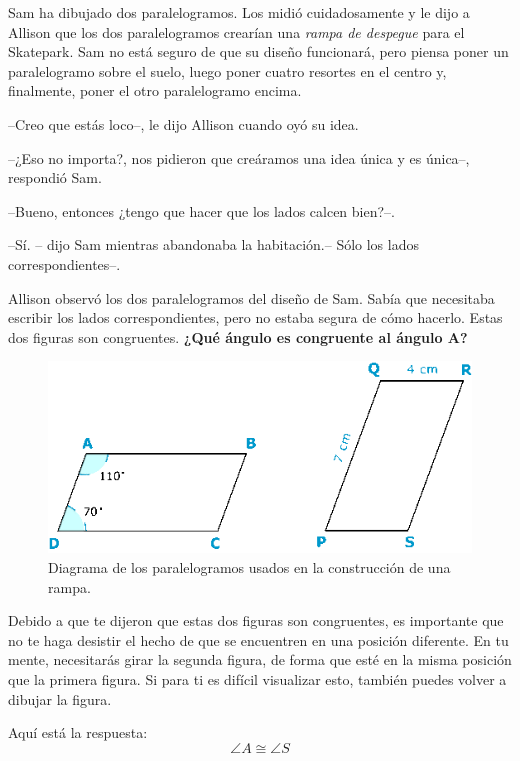 Sam ha dibujado dos paralelogramos. Los midió cuidadosamente y le dijo a Allison que los dos paralelogramos crearían una \emph{rampa de despegue} para el Skatepark. Sam no está seguro de que su diseño funcionará, pero piensa poner un paralelogramo sobre el suelo, luego poner cuatro resortes en el centro y, finalmente, poner el otro paralelogramo encima.

\begin{minipage}{0.6\textwidth}

    --Creo que estás loco--, le dijo Allison cuando oyó su idea.

    --¿Eso no importa?, nos pidieron que creáramos una idea única y es única--, respondió Sam.

    --Bueno, entonces ¿tengo que hacer que los lados calcen bien?--.

    --Sí. -- dijo Sam mientras abandonaba la habitación.-- Sólo los lados correspondientes--.

    Allison observó los dos paralelogramos del diseño de Sam. Sabía que necesitaba escribir los lados correspondientes, pero no estaba segura de cómo hacerlo. Estas dos figuras son congruentes.
    \textbf{¿Qué ángulo es congruente al ángulo A?}
\end{minipage}\hfill
\begin{minipage}{0.35\textwidth}
    \begin{figure}[H]
        \centering
        \includegraphics[width=\linewidth]{../images/congruencia01.png}
        \caption{Diagrama de los paralelogramos usados en la construcción de una rampa.}
        \label{fig:congruencia01}
    \end{figure}
\end{minipage}

\begin{solutionbox}{3.5cm}\footnotesize
    Debido a que te dijeron que estas dos figuras son congruentes, es importante que no te haga desistir el hecho de que se encuentren en una posición diferente. En tu mente, necesitarás girar la segunda figura, de forma que esté en la misma posición que la primera figura. Si para ti es difícil visualizar esto, también puedes volver a dibujar la figura.

    Aquí está la respuesta:
    \[\angle A \cong \angle S\]
\end{solutionbox}
